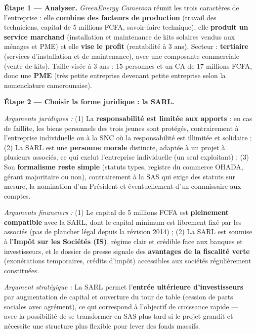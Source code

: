 \documentclass[11pt]{article}
\begin{document}
\begin{exoresolu}
\textbf{Étape 1 — Analyser.} \emph{GreenEnergy Cameroon} réunit les trois caractères de l'entreprise : elle \textbf{combine des facteurs de production} (travail des techniciens, capital de 5 millions FCFA, savoir-faire technique), elle \textbf{produit un service marchand} (installation et maintenance de kits solaires vendus aux ménages et PME) et elle \textbf{vise le profit} (rentabilité à 3 ans). Secteur : \textbf{tertiaire} (services d'installation et de maintenance), avec une composante commerciale (vente de kits). Taille visée à 3 ans : 15 personnes et un CA de 17 millions FCFA, donc une \textbf{PME} (très petite entreprise devenant petite entreprise selon la nomenclature camerounaise).

\tcblower

\textbf{Étape 2 — Choisir la forme juridique : la SARL.}

\emph{Arguments juridiques :} (1) La \textbf{responsabilité est limitée aux apports} : en cas de faillite, les biens personnels des trois jeunes sont protégés, contrairement à l'entreprise individuelle ou à la SNC où la responsabilité est illimitée et solidaire ; (2) La SARL est une \textbf{personne morale} distincte, adaptée à un projet à plusieurs associés, ce qui exclut l'entreprise individuelle (un seul exploitant) ; (3) Son \textbf{formalisme reste simple} (statuts types, registre du commerce OHADA, gérant majoritaire ou non), contrairement à la SAS qui exige des statuts sur mesure, la nomination d'un Président et éventuellement d'un commissaire aux comptes.

\emph{Arguments financiers :} (1) Le capital de 5 millions FCFA est \textbf{pleinement compatible} avec la SARL, dont le capital minimum est librement fixé par les associés (pas de plancher légal depuis la révision 2014) ; (2) La SARL est soumise à l'\textbf{Impôt sur les Sociétés (IS)}, régime clair et crédible face aux banques et investisseurs, et le dossier de presse signale des \textbf{avantages de la fiscalité verte} (exonérations temporaires, crédits d'impôt) accessibles aux sociétés régulièrement constituées.

\emph{Argument stratégique :} La SARL permet l'\textbf{entrée ultérieure d'investisseurs} par augmentation de capital et ouverture du tour de table (cession de parts sociales avec agrément), ce qui correspond à l'objectif de croissance rapide — avec la possibilité de se transformer en SAS plus tard si le projet grandit et nécessite une structure plus flexible pour lever des fonds massifs.


\end{exoresolu}
\end{document}
